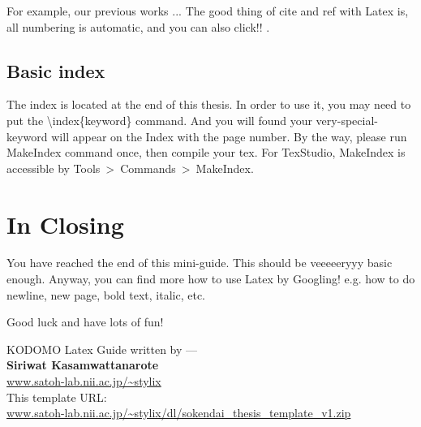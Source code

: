 For example, our previous works \cite{BibKeyLabel1,BibKeyLabel2}... The good thing of cite and ref with Latex is, all numbering is automatic, and you can also click!! \cite{BibKeyLabel3}.

\clearpage %


\subsection{Basic index}
\label{basic_index}
The index is located at the end of this thesis.
In order to use it,
you may need to put the \textbackslash index\{keyword\} command.
And you will found your very-special-keyword  will appear on the Index with the page number.
By the way, please run MakeIndex command once, then compile your tex.
\eg For TexStudio, MakeIndex is accessible by Tools~\textgreater~Commands~\textgreater~MakeIndex.

\clearpage %


\section{In Closing}
\label{closing}
You have reached the end of this mini-guide. This should be veeeeeryyy basic enough. Anyway, you can find more how to use Latex by Googling! e.g. how to do newline, new page, bold text, italic, etc.

Good luck and have lots of fun!

\begin{flushright}
KODOMO Latex Guide written by ---\\
\textbf{Siriwat Kasamwattanarote}\\ \href{http://www.satoh-lab.nii.ac.jp/~stylix}{www.satoh-lab.nii.ac.jp/\textasciitilde stylix}\\
This template URL:\\ \href{http://www.satoh-lab.nii.ac.jp/~stylix/dl/sokendai_thesis_template_v1.zip}{www.satoh-lab.nii.ac.jp/\textasciitilde stylix/dl/sokendai\_thesis\_template\_v1.zip}
\end{flushright}
